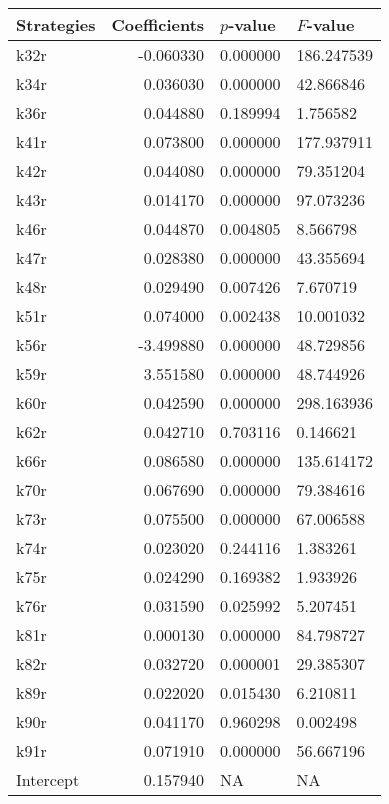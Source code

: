 \begin{tabular}{lrll}
\toprule
Strategies & Coefficients & $p$-value & $F$-value \\
\midrule
k32r & -0.060330 & 0.000000 & 186.247539 \\
k34r & 0.036030 & 0.000000 & 42.866846 \\
k36r & 0.044880 & 0.189994 & 1.756582 \\
k41r & 0.073800 & 0.000000 & 177.937911 \\
k42r & 0.044080 & 0.000000 & 79.351204 \\
k43r & 0.014170 & 0.000000 & 97.073236 \\
k46r & 0.044870 & 0.004805 & 8.566798 \\
k47r & 0.028380 & 0.000000 & 43.355694 \\
k48r & 0.029490 & 0.007426 & 7.670719 \\
k51r & 0.074000 & 0.002438 & 10.001032 \\
k56r & -3.499880 & 0.000000 & 48.729856 \\
k59r & 3.551580 & 0.000000 & 48.744926 \\
k60r & 0.042590 & 0.000000 & 298.163936 \\
k62r & 0.042710 & 0.703116 & 0.146621 \\
k66r & 0.086580 & 0.000000 & 135.614172 \\
k70r & 0.067690 & 0.000000 & 79.384616 \\
k73r & 0.075500 & 0.000000 & 67.006588 \\
k74r & 0.023020 & 0.244116 & 1.383261 \\
k75r & 0.024290 & 0.169382 & 1.933926 \\
k76r & 0.031590 & 0.025992 & 5.207451 \\
k81r & 0.000130 & 0.000000 & 84.798727 \\
k82r & 0.032720 & 0.000001 & 29.385307 \\
k89r & 0.022020 & 0.015430 & 6.210811 \\
k90r & 0.041170 & 0.960298 & 0.002498 \\
k91r & 0.071910 & 0.000000 & 56.667196 \\
Intercept & 0.157940 & NA & NA \\
\bottomrule
\end{tabular}
